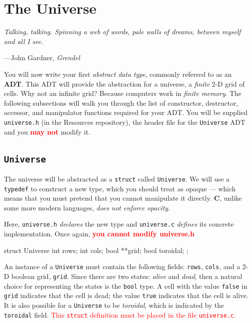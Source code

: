 \documentclass[11pt]{article}
\begin{document}
\section{The Universe}
\epigraph{\emph{Talking, talking. Spinning a web of words, pale walls of dreams, between myself and all I see.}}
{---John Gardner, \emph{Grendel}}

You will now write your first \emph{abstract data type},
commonly referred to as an \textbf{ADT}. This ADT will provide the abstraction
for a universe, a \emph{finite} 2-D grid of cells. Why not an infinite grid?
Because computers work in \emph{finite memory}. The following subsections will
walk you through the list of constructor, destructor, accessor, and manipulator
functions required for your ADT. You will be supplied \texttt{universe.h} (in the Resources repository), the
header file for the \texttt{Universe} ADT and you \textcolor{red}{\textbf{may not}} modify it.

\subsection{\texttt{Universe}}

The universe will be abstracted as a \texttt{struct} called \texttt{Universe}.
We will use a \texttt{typedef} to construct a new type, which you should treat
as opaque --- which means that you must pretend that you cannot manipulate it
directly. \textbf{C}, unlike some more modern languages, \emph{does not enforce opacity}.

Here, \texttt{universe.h} \emph{declares} the new type and \texttt{universe.c} \emph{defines} its concrete implementation.
Once again, \textcolor{red}{\textbf{you cannot modify universe.h}}

\begin{codelisting}{}
struct Universe {
    int rows;
    int cols;
    bool **grid;
    bool toroidal;
};
\end{codelisting}

An instance of a \texttt{Universe} must contain the following fields:
\texttt{rows}, \texttt{cols}, and a 2-D boolean grid, \texttt{grid}. Since there
are two states: \emph{alive} and \emph{dead}, then a natural choice for
representing the states is the \texttt{bool} type. A cell with the value
\texttt{false} in \texttt{grid} indicates that the cell is dead; the value
\texttt{true} indicates that the cell is alive. It is also possible for a
\texttt{Universe} to be \emph{toroidal}, which is indicated by the
\texttt{toroidal} field. \textcolor{red}{This \texttt{struct} definition must
be placed in the file \texttt{universe.c}.}
\end{document}
